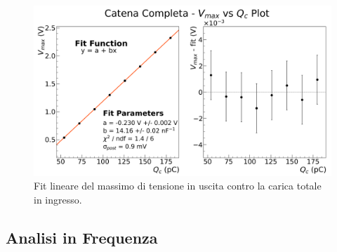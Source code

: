 \documentclass[a4paper,11pt]{article} %
\begin{document}
\begin{figure}[H] 
	\centering 
	\includegraphics[width=0.8\linewidth]{../Plots/Catena/catena_linearity.png}
	\vspace{-10pt}
	\caption{\small Fit lineare del massimo di tensione in uscita contro la carica totale in ingresso.}
	\label{i:catena_linearity} 
\end{figure} 
\vspace{-7pt}


\subsection{Analisi in Frequenza}\label{s:catena_bode}
\end{document}
